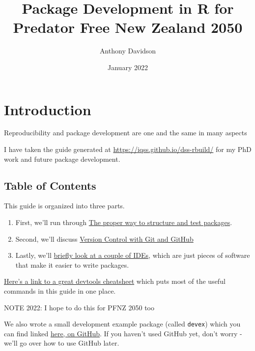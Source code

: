 \documentclass[
]{book}
\title{Package Development in R for Predator Free New Zealand 2050}
\author{Anthony Davidson}
\date{January 2022}
\begin{document}
\maketitle

{
\setcounter{tocdepth}{1}
\tableofcontents
}
\hypertarget{introduction}{%
\chapter*{Introduction}\label{introduction}}

Reproducibility and package development are one and the same in many aspects

I have taken the guide generated at \url{https://iqss.github.io/dss-rbuild/} for my PhD work and future package development.

\hypertarget{table-of-contents}{%
\section*{Table of Contents}\label{table-of-contents}}

This guide is organized into three parts.

\begin{enumerate}
\def\labelenumi{\arabic{enumi}.}
\item
  First, we'll run through \href{./package-development.html}{The proper way to structure and test packages}.
\item
  Second, we'll discuss \href{./version-control.html}{Version Control with Git and GitHub}
\item
  Lastly, we'll \href{./integrated-development-environments.html}{briefly look at a couple of IDEs}, which are just pieces of software that make it easier to write packages.
\end{enumerate}

\href{https://www.rstudio.com/wp-content/uploads/2015/03/devtools-cheatsheet.pdf}{Here's a link to a great devtools cheatsheet} which puts most of the useful commands in this guide in one place.

NOTE 2022: I hope to do this for PFNZ 2050 too

We also wrote a small development example package (called \texttt{devex}) which you can find linked \href{https://github.com/IQSS/dss-rbuild/tree/master/devex}{here, on GitHub}. If you haven't used GitHub yet, don't worry - we'll go over how to use GitHub later.
\end{document}
